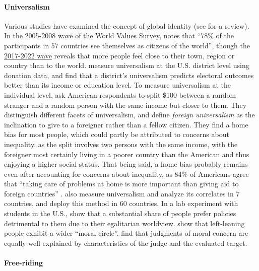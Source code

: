\documentclass[12pt,english]{article}
\begin{document}
\paragraph{Universalism}
Various studies have examined the concept of global identity (see %
\citet{reysen_psychology_2018} for a review). In the 2005-2008 wave of the World Values Survey, \citet{bayram_what_2015} notes that ``78\% of the participants in 57 countries see themselves as citizens of the world'', though the \href{https://www.worldvaluessurvey.org/WVSDocumentationWV7.jsp}{2017-2022 wave} reveals that more people feel close to their town, region or country than to the world. \citet{enke_universalism_2023} measure universalism at the U.S. district level using donation data, and find that a district's universalism predicts electoral outcomes better than its income or education level. To measure universalism at the individual level, \citet{enke_moral_2023-1} ask American respondents to split \$100 between a random stranger and a random person with the same income but closer to them. They distinguish different facets of universalism, and define \textit{foreign universalism} as the inclination to give to a foreigner rather than a fellow citizen. They find a home bias for most people, which could partly be attributed to concerns about inequality, as the split involves two persons with the same income, with the foreigner most certainly living in a poorer country than the American and thus enjoying a higher social status. 
That being said, a home bias probably remains even after accounting for concerns about  inequality, as 84\% of Americans agree that ``taking care of problems at home is more important than giving aid to foreign countries'' \citep{pipa_americans_2001}. 
\citet{enke_moral_2023} also measure universalism and analyze its correlates in 7 countries, and \citet{cappelen_universalism_2022} deploy this method in 60 countries. 
In a lab experiment with students in the U.S., \citet{cherry_accepting_2017} show that a substantial share of people prefer policies detrimental to them due to their egalitarian worldview. \citet{waytz_ideological_2019} show that left-leaning people exhibit a wider ``moral circle''. \citet{jaeger_relative_2021} find that judgments of moral concern are equally well explained by characteristics of the judge and the evaluated target.

\paragraph{Free-riding}
\end{document}
